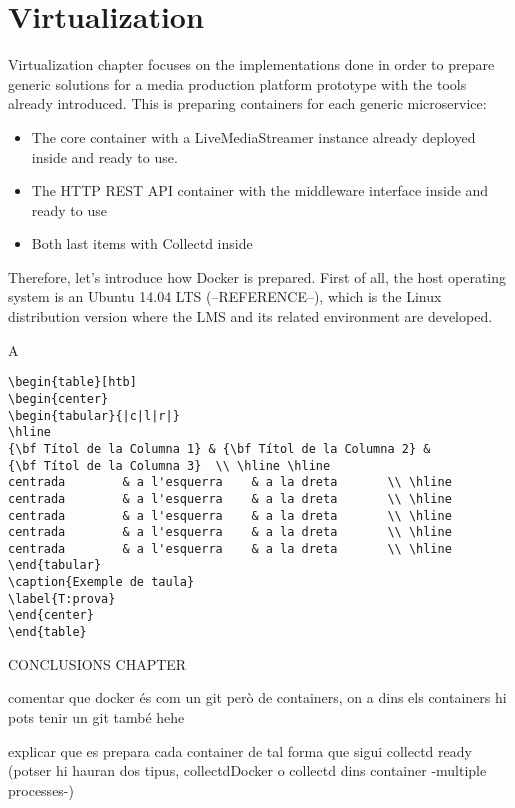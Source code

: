 \chapter{Virtualization}\label{D:virtualization}

Virtualization chapter focuses on the implementations done in order to prepare generic solutions for a media production platform prototype with the tools already introduced. This is preparing containers for each generic microservice:

\begin{itemize}
\item The core container with a LiveMediaStreamer instance already deployed inside and ready to use.
\item The HTTP REST API container with the middleware interface inside and ready to use
\item Both last items with Collectd inside
\end{itemize}

Therefore, let's introduce how Docker is prepared. First of all, the host operating system is an Ubuntu 14.04 LTS (--REFERENCE--), which is the Linux distribution version where the LMS and its related environment are developed. 

A



\begin{verbatim}
\begin{table}[htb]
\begin{center}
\begin{tabular}{|c|l|r|}
\hline
{\bf Títol de la Columna 1} & {\bf Títol de la Columna 2} & 
{\bf Títol de la Columna 3}  \\ \hline \hline
centrada        & a l'esquerra    & a la dreta       \\ \hline
centrada        & a l'esquerra    & a la dreta       \\ \hline
centrada        & a l'esquerra    & a la dreta       \\ \hline
centrada        & a l'esquerra    & a la dreta       \\ \hline
centrada        & a l'esquerra    & a la dreta       \\ \hline
\end{tabular}
\caption{Exemple de taula}
\label{T:prova}
\end{center}
\end{table}
\end{verbatim}




CONCLUSIONS CHAPTER

comentar que docker és com un git però de containers, on a dins els containers hi pots tenir un git també hehe

explicar que es prepara cada container de tal forma que sigui collectd ready (potser hi hauran dos tipus, collectdDocker o collectd dins container -multiple processes-)

